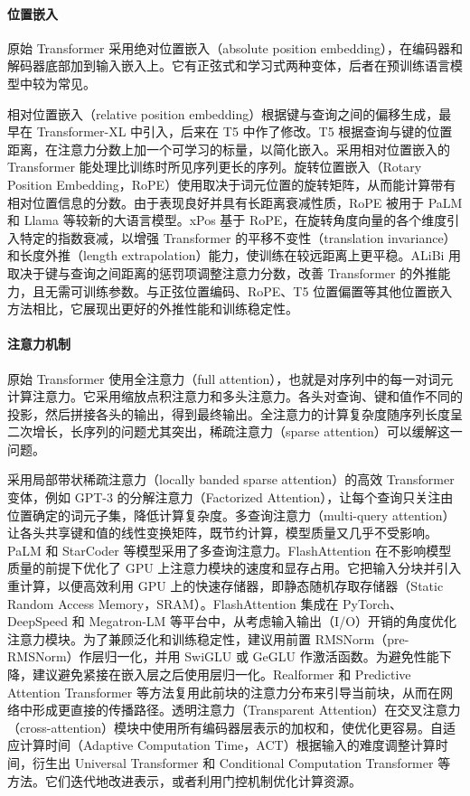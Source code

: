\paragraph{位置嵌入}
原始 Transformer 采用绝对位置嵌入（absolute position embedding），在编码器和解码器底部加到输入嵌入上。它有正弦式和学习式两种变体，后者在预训练语言模型中较为常见。

\begin{practicaltip}
相对位置嵌入（relative position embedding）根据键与查询之间的偏移生成，最早在 Transformer-XL 中引入，后来在 T5 中作了修改。T5 根据查询与键的位置距离，在注意力分数上加一个可学习的标量，以简化嵌入。采用相对位置嵌入的 Transformer 能处理比训练时所见序列更长的序列。旋转位置嵌入（Rotary Position Embedding，RoPE）使用取决于词元位置的旋转矩阵，从而能计算带有相对位置信息的分数。由于表现良好并具有长距离衰减性质，RoPE 被用于 PaLM 和 Llama 等较新的大语言模型。xPos 基于 RoPE，在旋转角度向量的各个维度引入特定的指数衰减，以增强 Transformer 的平移不变性（translation invariance）和长度外推（length extrapolation）能力，使训练在较远距离上更平稳。ALiBi 用取决于键与查询之间距离的惩罚项调整注意力分数，改善 Transformer 的外推能力，且无需可训练参数。与正弦位置编码、RoPE、T5 位置偏置等其他位置嵌入方法相比，它展现出更好的外推性能和训练稳定性。
\end{practicaltip}

\paragraph{注意力机制}
原始 Transformer 使用全注意力（full attention），也就是对序列中的每一对词元计算注意力。它采用缩放点积注意力和多头注意力。各头对查询、键和值作不同的投影，然后拼接各头的输出，得到最终输出。全注意力的计算复杂度随序列长度呈二次增长，长序列的问题尤其突出，稀疏注意力（sparse attention）可以缓解这一问题。

\begin{practicaltip}
采用局部带状稀疏注意力（locally banded sparse attention）的高效 Transformer 变体，例如 GPT-3 的分解注意力（Factorized Attention），让每个查询只关注由位置确定的词元子集，降低计算复杂度。多查询注意力（multi-query attention）让各头共享键和值的线性变换矩阵，既节约计算，模型质量又几乎不受影响。PaLM 和 StarCoder 等模型采用了多查询注意力。FlashAttention 在不影响模型质量的前提下优化了 GPU 上注意力模块的速度和显存占用。它把输入分块并引入重计算，以便高效利用 GPU 上的快速存储器，即静态随机存取存储器（Static Random Access Memory，SRAM）。FlashAttention 集成在 PyTorch、DeepSpeed 和 Megatron-LM 等平台中，从考虑输入输出（I/O）开销的角度优化注意力模块。为了兼顾泛化和训练稳定性，建议用前置 RMSNorm（pre-RMSNorm）作层归一化，并用 SwiGLU 或 GeGLU 作激活函数。为避免性能下降，建议避免紧接在嵌入层之后使用层归一化。Realformer 和 Predictive Attention Transformer 等方法复用此前块的注意力分布来引导当前块，从而在网络中形成更直接的传播路径。透明注意力（Transparent Attention）在交叉注意力（cross-attention）模块中使用所有编码器层表示的加权和，使优化更容易。自适应计算时间（Adaptive Computation Time，ACT）根据输入的难度调整计算时间，衍生出 Universal Transformer 和 Conditional Computation Transformer 等方法。它们迭代地改进表示，或者利用门控机制优化计算资源。
\end{practicaltip}

